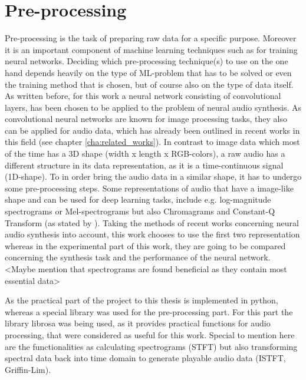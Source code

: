 \section{Pre-processing}
\label{sec:app_pre-processing}
Pre-processing is the task of preparing raw data for a specific purpose. Moreover it is an important component of machine learning techniques such as for training neural networks. Deciding which pre-processing technique(s) to use on the one hand depends heavily on the type of ML-problem that has to be solved or even the training method that is chosen, but of course also on the type of data itself. As written before, for this work a neural network consisting of convolutional layers, has been chosen to be applied to the problem of neural audio synthesis. As convolutional neural networks are known for image processing tasks, they also can be applied for audio data, which has already been outlined in recent works in this field (see chapter \ref{cha:related_works}). In contrast to image data which most of the time has a 3D shape (width x length x RGB-colors), a raw audio has a different structure in its data representation, as it is a time-continuous signal (1D-shape). To in order bring the audio data in a similar shape, it has to undergo some pre-processing steps. Some representations of audio that have a image-like shape and can be used for deep learning tasks, include e.g. log-magnitude spectrograms or Mel-spectrograms but also Chromagrams and Constant-Q Transform (as stated by \cite{choi2018tutorial}). Taking the methods of recent works concerning neural audio synthesis into account, this work chooses to use the first two representation whereas in the experimental part of this work, they are going to be compared concerning the synthesis task and the performance of the neural network. <Maybe mention that spectrograms are found beneficial as they contain most essential data>

As the practical part of the project to this thesis is implemented in python, whereas a special library was used for the pre-processing part. For this part the library librosa \cite{brian_mcfee_2022_6097378} was being used, as it provides practical functions for audio processing, that were considered as useful for this work. Special to mention here are the functionalities as calculating spectrograms (STFT) but also transforming spectral data back into time domain to generate playable audio data (ISTFT, Griffin-Lim).


